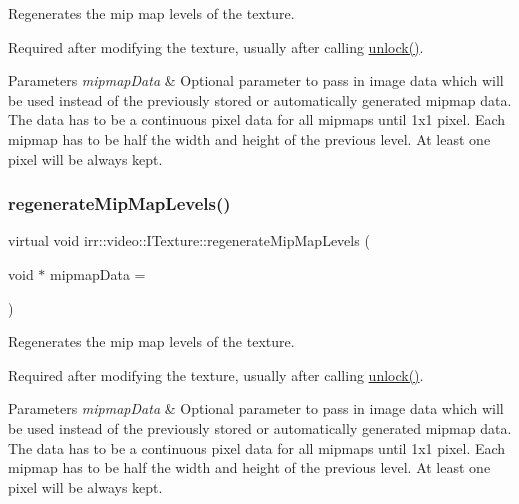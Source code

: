 Regenerates the mip map levels of the texture. 

Required after modifying the texture, usually after calling \hyperlink{classirr_1_1video_1_1ITexture_a15b9a25aa18528ade37a492bd7b20a10}{unlock()}. 
\begin{DoxyParams}{Parameters}
{\em mipmap\+Data} & Optional parameter to pass in image data which will be used instead of the previously stored or automatically generated mipmap data. The data has to be a continuous pixel data for all mipmaps until 1x1 pixel. Each mipmap has to be half the width and height of the previous level. At least one pixel will be always kept. \\
\hline
\end{DoxyParams}
\mbox{\label{classirr_1_1video_1_1ITexture_a9517c37f071479d0698cdf597f8fea45}} 
\subsubsection{\texorpdfstring{regenerate\+Mip\+Map\+Levels()}{regenerateMipMapLevels()}\hspace{0.1cm}{\footnotesize\ttfamily [2/2]}}
{\footnotesize\ttfamily virtual void irr\+::video\+::\+I\+Texture\+::regenerate\+Mip\+Map\+Levels (\begin{DoxyParamCaption}\item[{void $\ast$}]{mipmap\+Data = {} }\end{DoxyParamCaption})\hspace{0.3cm}{\ttfamily [pure virtual]}}



Regenerates the mip map levels of the texture. 

Required after modifying the texture, usually after calling \hyperlink{classirr_1_1video_1_1ITexture_a15b9a25aa18528ade37a492bd7b20a10}{unlock()}. 
\begin{DoxyParams}{Parameters}
{\em mipmap\+Data} & Optional parameter to pass in image data which will be used instead of the previously stored or automatically generated mipmap data. The data has to be a continuous pixel data for all mipmaps until 1x1 pixel. Each mipmap has to be half the width and height of the previous level. At least one pixel will be always kept. \\
\hline
\end{DoxyParams}
\mbox{\label{classirr_1_1video_1_1ITexture_a15b9a25aa18528ade37a492bd7b20a10}} 
